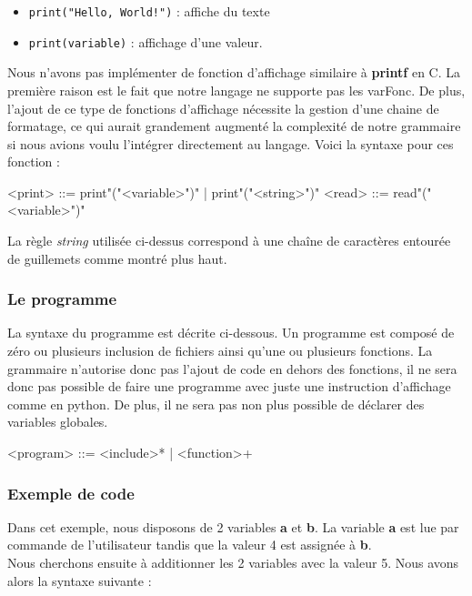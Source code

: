 \documentclass[a4paper]{article}%
\begin{document}
\begin{itemize}
  \item \lstinline{print("Hello, World!")} : affiche du texte
  \item \lstinline{print(variable)} : affichage d'une valeur.
\end{itemize}

Nous n'avons pas implémenter de fonction d'affichage similaire à \textbf{printf}
en C. La première raison est le fait que notre langage ne supporte pas les
\gls{varFonc}. De plus, l'ajout de ce type de fonctions d'affichage nécessite la
gestion d'une chaine de formatage, ce qui aurait grandement augmenté la
complexité de notre grammaire si nous avions voulu l'intégrer directement au
langage. Voici la syntaxe pour ces fonction :

\begin{grammar}
  <print> ::= print"("<variable>")" | print"("<string>")"
  <read> ::= read"("<variable>")"
\end{grammar}\leavevmode\newline

La règle \textit{string} utilisée ci-dessus correspond à une chaîne de caractères
entourée de guillemets comme montré plus haut.

\subsubsection*{Le programme}

La syntaxe du programme est décrite ci-dessous. Un programme est composé de zéro
ou plusieurs inclusion de fichiers ainsi qu'une ou plusieurs fonctions. La
grammaire n'autorise donc pas l'ajout de code en dehors des fonctions, il ne
sera donc pas possible de faire une programme avec juste une instruction
d'affichage comme en python. De plus, il ne sera pas non plus possible de
déclarer des variables globales.

\begin{grammar}
  <program> ::= <include>* | <function>+
\end{grammar}\leavevmode\newline

\subsubsection*{Exemple de code}

Dans cet exemple, nous disposons de 2 variables \textbf{a} et \textbf{b}. La
variable \textbf{a} est lue par commande de l'utilisateur tandis que la valeur 4
est assignée à \textbf{b}.\\
Nous cherchons ensuite à additionner les 2 variables avec la valeur 5. Nous avons alors la syntaxe suivante :\\
\end{document}
